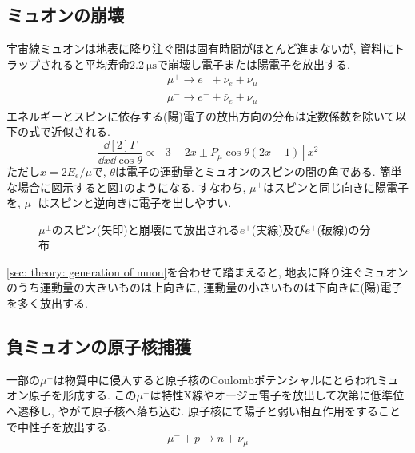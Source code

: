 \documentclass[dvipdfmx]{jsarticle}
\begin{document}
\subsection{ミュオンの崩壊}
\label{sec: theory: decay of muon}

宇宙線ミュオンは地表に降り注ぐ間は固有時間がほとんど進まないが,
資料にトラップされると平均寿命$\SI{2.2}{\micro\second}$で崩壊し電子または陽電子を放出する.
\begin{align*}
    &\mu^+\to e^++\nu_e+\bar{\nu}_\mu
    \\
    &\mu^-\to e^-+\bar{\nu}_e+\nu_\mu
\end{align*}
エネルギーとスピンに依存する(陽)電子の放出方向の分布は定数係数を除いて以下の式で近似される\cite{PDG}.
\begin{equation*}
    \frac{\dd[2]{\Gamma}}{\dd{x}\dd{\cos\theta}}
    \propto
    [3-2x\pm P_\mu\cos\theta(2x-1)]x^2
\end{equation*}
ただし$x=2E_e/\mu$で, $\theta$は電子の運動量とミュオンのスピンの間の角である.
簡単な場合に図示すると図\ref{fig: muon decay distrib.}のようになる.
すなわち, $\mu^+$はスピンと同じ向きに陽電子を, $\mu^-$はスピンと逆向きに電子を出しやすい.

\begin{figure}
    \centering
    
    \caption{$\mu^\pm$のスピン(矢印)と崩壊にて放出される$e^+$(実線)及び$e^+$(破線)の分布}
    \label{fig: muon decay distrib.}
\end{figure}

\ref{sec: theory: generation of muon}を合わせて踏まえると, 地表に降り注ぐミュオンのうち運動量の大きいものは上向きに, 運動量の小さいものは下向きに(陽)電子を多く放出する.


\subsection{負ミュオンの原子核捕獲}
\label{sec: theory: negative muon capture}

一部の$\mu^-$は物質中に侵入すると原子核のCoulombポテンシャルにとらわれミュオン原子を形成する.
この$\mu^-$は特性X線やオージェ電子を放出して次第に低準位へ遷移し, やがて原子核へ落ち込む.
原子核にて陽子と弱い相互作用をすることで中性子を放出する.
\begin{equation*}
    \mu^-+p\to n+\nu_\mu
\end{equation*}
\end{document}
